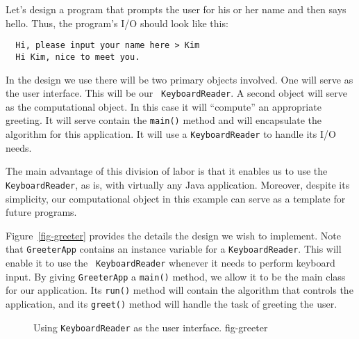 Let's design a program that prompts the user for his or her name and
then says hello. Thus, the program's I/O should look like this:

\begin{jjjlisting}
\begin{lstlisting}
  Hi, please input your name here > Kim
  Hi Kim, nice to meet you.
\end{lstlisting}
\end{jjjlisting}

In the design we use there will be two primary objects involved. One
will serve as the user interface. This will be our {\tt
KeyboardReader}. A second object will serve as the computational
object.  In this case it will ``compute'' an appropriate greeting.  It
will serve contain the {\tt main()} method and will encapsulate the
algorithm for this application. It will use a {\tt KeyboardReader} to
handle its I/O needs.

The main advantage of this division of labor is that it enables us to
use the {\tt KeyboardReader}, as is, with virtually any Java
application. Moreover, despite its simplicity,  our computational
object in this example can serve as a template for future 
programs.



 
Figure~\ref{fig-greeter} provides the details the design we wish to
implement. Note that {\tt GreeterApp} contains an instance variable
for a {\tt KeyboardReader}.  This will enable it to use the {\tt
KeyboardReader} whenever it needs to perform keyboard input. By giving
{\tt GreeterApp} a {\tt main()} method, we allow it to be the main
class for our application.  Its {\tt run()} method will contain the
algorithm that controls the application, and its {\tt greet()} method
will handle the task of greeting the user.

\begin{figure}[h]
{Using {\tt Key\-board\-Read\-er} as the user interface.}
{fig-greeter}
\end{figure}

